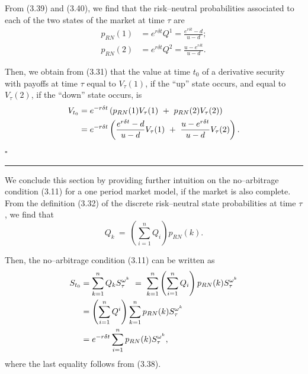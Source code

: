 
From (3.39) and (3.40), we find that the risk--neutral probabilities
associated to each of the two states of the market at time $\tau$ are
\begin{align*}
p_{RN}(1) &= e^{r\delta t} Q^1 = \frac{e^{r\delta t}-d}{u-d}; \\
p_{RN}(2) &= e^{r\delta t} Q^2 = \frac{u-e^{r\delta t}}{u-d}.
\end{align*}

Then, we obtain from (3.31) that the value at time $t_0$ of a derivative
security with payoffs at time $\tau$ equal to $V_\tau(1)$, if the ``up''
state occurs, and equal to $V_\tau(2)$, if the ``down'' state occurs, is
\begin{align}
V_{t_0} &= e^{-r\delta t}\left(p_{RN}(1)V_\tau(1) \ + \ p_{RN}(2)V_\tau(2)\right) \notag \\
        &= e^{-r\delta t}\left(\frac{e^{r\delta t}-d}{u-d}V_\tau(1) \ + \ \frac{u-e^{r\delta t}}{u-d}V_\tau(2)\right).
\end{align}
\hfill$\square$

\medskip
\noindent\rule{\linewidth}{0.4pt}
\medskip

We conclude this section by providing further intuition on the
no--arbitrage condition (3.11) for a one period market model, if the
market is also complete. From the definition (3.32) of the discrete
risk--neutral state probabilities at time $\tau$, we find that
\[
Q_k \ = \ \left(\sum_{i=1}^n Q_i\right) p_{RN}(k).
\]

Then, the no--arbitrage condition (3.11) can be written as
\begin{align}
S_{t_0} &= \sum_{k=1}^n Q_k S_\tau^{\omega^k} \ = \ \sum_{k=1}^n \left(\sum_{i=1}^n Q_i\right) p_{RN}(k) S_\tau^{\omega^k} \notag \\
        &= \left(\sum_{i=1}^n Q^i\right) \sum_{k=1}^n p_{RN}(k) S_\tau^{\omega^k} \notag \\
        &= e^{-r\delta t} \sum_{i=1}^n p_{RN}(k) S_\tau^{\omega^k},
\end{align}
where the last equality follows from (3.38).


